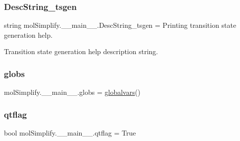 \subsubsection{\texorpdfstring{Desc\+String\+\_\+tsgen}{DescString\_tsgen}}
{\footnotesize\ttfamily string mol\+Simplify.\+\_\+\+\_\+main\+\_\+\+\_\+.\+Desc\+String\+\_\+tsgen = \textquotesingle{}Printing transition state generation help.\textquotesingle{}}



Transition state generation help description string. 

\mbox{\label{namespacemolSimplify_1_1____main_____a621b1b32cbc714e9bd9c879933b298e7}} 
\subsubsection{\texorpdfstring{globs}{globs}}
{\footnotesize\ttfamily mol\+Simplify.\+\_\+\+\_\+main\+\_\+\+\_\+.\+globs = \hyperlink{classmolSimplify_1_1Classes_1_1globalvars_1_1globalvars}{globalvars}()}

\mbox{\label{namespacemolSimplify_1_1____main_____a014c496de4ba28be70d30b5c0b77919b}} 
\subsubsection{\texorpdfstring{qtflag}{qtflag}}
{\footnotesize\ttfamily bool mol\+Simplify.\+\_\+\+\_\+main\+\_\+\+\_\+.\+qtflag = True}

